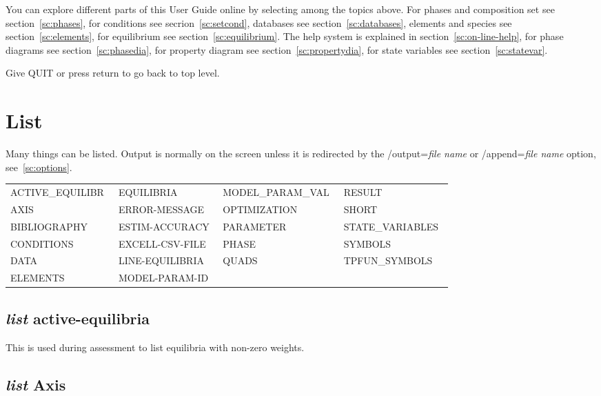 \documentclass[11pt]{article}
\begin{document}
You can explore different parts of this User Guide online by selecting
among the topics above.  For phases and composition set see
section~\ref{sc:phases}, for conditions see secrion~\ref{sc:setcond},
databases see section~\ref{sc:databases}, elements and species see
section~\ref{sc:elements}, for equilibrium see
section~\ref{sc:equilibrium}.  The help system is explained in
section~\ref{sc:on-line-help}, for phase diagrams see
section~\ref{sc:phasedia}, for property diagram see
section~\ref{sc:propertydia}, for state variables see
section~\ref{sc:statevar}.

Give QUIT or press return to go back to top level.

\hypertarget{List}{}
\section{List }

Many things can be listed.  Output is normally on the screen unless it
is redirected by the /output={\em file name} or /append={\em file
  name} option, see~\ref{sc:options}.

{\small
\begin{tabular}{llll}
 ACTIVE\_EQUILIBR~ & EQUILIBRIA       & MODEL\_PARAM\_VAL~  & RESULT \\
 AXIS              & ERROR-MESSAGE    & OPTIMIZATION~       & SHORT \\
 BIBLIOGRAPHY~     & ESTIM-ACCURACY   & PARAMETER~    & STATE\_VARIABLES~\\
 CONDITIONS        & EXCELL-CSV-FILE~ & PHASE         & SYMBOLS\\ 
 DATA              & LINE-EQUILIBRIA~ & QUADS         & TPFUN\_SYMBOLS\\
 ELEMENTS          & MODEL-PARAM-ID~  &                 \\
\end{tabular}
}

\hypertarget{List active}{}
\subsection{{\em list} active-equilibria}

This is used during assessment to list equilibria with non-zero weights.

\hypertarget{List axis}{}
\subsection{{\em list} Axis}
\end{document}
